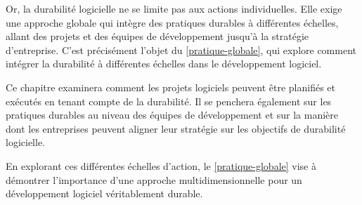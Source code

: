 Or, la durabilité logicielle ne se limite pas aux actions individuelles. Elle exige une approche globale qui intègre des pratiques durables à différentes échelles, allant des projets et des équipes de développement jusqu'à la stratégie d'entreprise. C'est précisément l'objet du \ref{pratique-globale}, qui explore comment intégrer la durabilité à différentes échelles dans le développement logiciel.


Ce chapitre examinera comment les projets logiciels peuvent être planifiés et exécutés en tenant compte de la durabilité. Il se penchera également sur les pratiques durables au niveau des équipes de développement et sur la manière dont les entreprises peuvent aligner leur stratégie sur les objectifs de durabilité logicielle.


En explorant ces différentes échelles d'action, le \ref{pratique-globale} vise à démontrer l'importance d'une approche multidimensionnelle pour un développement logiciel véritablement durable.

